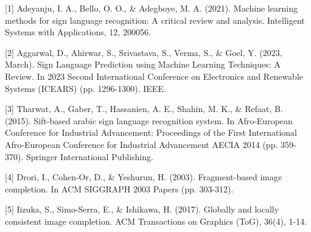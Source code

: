 \documentclass{article}
\begin{document}
{
\small


[1] Adeyanju, I. A., Bello, O. O., \& Adegboye, M. A. (2021). Machine learning methods for sign language recognition: A critical review and analysis. Intelligent Systems with Applications, 12, 200056.


[2] Aggarwal, D., Ahirwar, S., Srivastava, S., Verma, S., \& Goel, Y. (2023, March). Sign Language Prediction using Machine Learning Techniques: A Review. In 2023 Second International Conference on Electronics and Renewable Systems (ICEARS) (pp. 1296-1300). IEEE.


[3] Tharwat, A., Gaber, T., Hassanien, A. E., Shahin, M. K., \& Refaat, B. (2015). Sift-based arabic sign language recognition system. In Afro-European Conference for Industrial Advancement: Proceedings of the First International Afro-European Conference for Industrial Advancement AECIA 2014 (pp. 359-370). Springer International Publishing.


[4] Drori, I., Cohen-Or, D., \& Yeshurun, H. (2003). Fragment-based image completion. In ACM SIGGRAPH 2003 Papers (pp. 303-312).


[5] Iizuka, S., Simo-Serra, E., \& Ishikawa, H. (2017). Globally and locally consistent image completion. ACM Transactions on Graphics (ToG), 36(4), 1-14.
}
\end{document}
